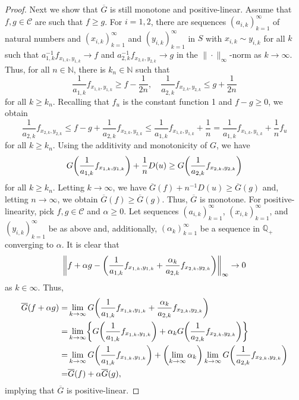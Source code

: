 \documentclass[12pt,a4paper,reqno]{amsart}
\theoremstyle{definition}
\newcommand{\mc}[1]{\mathcal{#1}}
\newcommand{\N}{\mathbb N}
\newcommand{\Q}{\mathbb Q}
\let\originalleft\left
\let\originalright\right
\renewcommand{\left}{\mathopen{}\mathclose\bgroup\originalleft}
\renewcommand{\right}{\aftergroup\egroup\originalright}
\begin{document}
\begin{proof}
Next we show that $\overline{G}$ is still monotone and positive-linear. Assume that $f,g\in\mc C$ are such that $f\geq g$. For $i=1,2$, there are sequences $(a_{i,k})_{k=1}^\infty$ of natural numbers and $(x_{i,k})_{k=1}^\infty$ and $(y_{i,k})_{k=1}^\infty$ in $S$ with $x_{i,k}\sim y_{i,k}$ for all $k$ such that $a_{1,k}^{-1}f_{x_{1,k},y_{1,k}}\to f$ and $a_{2,k}^{-1}f_{x_{2,k},y_{2,k}}\to g$ in the $\|\cdot\|_\infty$-norm as $k\to\infty$. Thus, for all $n\in\N$, there is $k_n\in\N$ such that
$$
\frac{1}{a_{1,k}}f_{x_{1,k},y_{1,k}}\geq f-\frac{1}{2n},\quad\frac{1}{a_{2,k}}f_{x_{2,k},y_{2,k}}\leq g+\frac{1}{2n}
$$
for all $k\geq k_n$. Recalling that $f_u$ is the constant function 1 and $f-g\geq0$, we obtain
$$
\frac{1}{a_{2,k}}f_{x_{2,k},y_{2,k}}\leq f-g+\frac{1}{a_{2,k}}f_{x_{2,k},y_{2,k}}\leq\frac{1}{a_{1,k}}f_{x_{1,k},y_{1,k}}+\frac{1}{n}=\frac{1}{a_{1,k}}f_{x_{1,k},y_{1,k}}+\frac{1}{n}f_u
$$
for all $k\geq k_n$. Using the additivity and monotonicity of $G$, we have
$$
G\left(\frac{1}{a_{1,k}}f_{x_{1,k},y_{1,k}}\right)+\frac{1}{n}D(u)\geq G\left(\frac{1}{a_{2,k}}f_{x_{2,k},y_{2,k}}\right)
$$
for all $k\geq k_n$. Letting $k\to\infty$, we have $\overline{G}(f)+n^{-1}D(u)\geq\overline{G}(g)$ and, letting $n\to\infty$, we obtain $\overline{G}(f)\geq\overline{G}(g)$. Thus, $\overline{G}$ is monotone. For positive-linearity, pick $f,g\in\mc C$ and $\alpha\geq0$. Let sequences $(a_{i,k})_{k=1}^\infty$, $(x_{i,k})_{k=1}^\infty$, and $(y_{i,k})_{k=1}^\infty$ be as above and, additionally, $(\alpha_k)_{k=1}^\infty$ be a sequence in $\Q_+$ converging to $\alpha$. It is clear that
$$
\left\|f+\alpha g-\left(\frac{1}{a_{1,k}}f_{x_{1,k},y_{1,k}}+\frac{\alpha_k}{a_{2,k}}f_{x_{2,k},y_{2,k}}\right)\right\|_\infty \to0
$$
as $k\in\infty$. Thus,
\begin{align*}
\overline{G}(f+\alpha g)=&\lim_{k\to\infty} G\left(\frac{1}{a_{1,k}}f_{x_{1,k},y_{1,k}}+\frac{\alpha_k}{a_{2,k}}f_{x_{2,k},y_{2,k}}\right)\\
=&\lim_{k\to\infty}\left\{G\left(\frac{1}{a_{1,k}}f_{x_{1,k},y_{1,k}}\right)+\alpha_k G\left(\frac{1}{a_{2,k}}f_{x_{2,k},y_{2,k}}\right)\right\}\\
=&\lim_{k\to\infty}G\left(\frac{1}{a_{1,k}}f_{x_{1,k},y_{1,k}}\right)+\left(\lim_{k\to\infty}\alpha_k\right)\lim_{k\to\infty}G\left(\frac{1}{a_{2,k}}f_{x_{2,k},y_{2,k}}\right)\\
=&\overline{G}(f)+\alpha\overline{G}(g),
\end{align*}
implying that $\overline{G}$ is positive-linear.


\end{proof}
\end{document}
